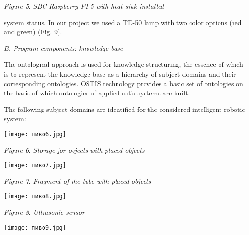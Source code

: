 \documentclass[10pt, letterpaper, twoside]{article}
\begin{document}
\begin{multicols}{2}
\begin{center}
\begin{minipage}{.4\textwidth}
\begin{center}
    \caption{\textsl{Figure 5. SBC Raspberry PI 5 with heat sink installed}}
        \end{center}
    \label{fig:enter-label5}
\end{minipage}
\end{center}
system status. In our project we used a TD-50 lamp with
two color options (red and green) (Fig. 9).
\vspace{3mm}

\textsl{B. Program components: knowledge base}
\vspace{3mm}

The ontological approach is used for knowledge structuring,
the essence of which is to represent the knowledge
base as a hierarchy of subject domains and their
corresponding ontologies. OSTIS technology provides a
basic set of ontologies on the basis of which ontologies
of applied ostis-systems are built.

The following subject domains are identified for the
considered intelligent robotic system:
\begin{center}
\begin{minipage}{.4\textwidth}
    \texttt{[image: пиво6.jpg]}
    \scriptsize
    \begin{center}
        

    \caption{\textsl{Figure 6. Storage for objects with placed objects}}
        \end{center}
    \label{fig:enter-label6}
\end{minipage}
\end{center}
\begin{center}
\begin{minipage}{.4\textwidth}
    \texttt{[image: пиво7.jpg]}
    \scriptsize
    \begin{center}
        

    \caption{\textsl{Figure 7. Fragment of the tube with placed objects}}
        \end{center}
    \label{fig:enter-label7}
\end{minipage}
\end{center}
\begin{center}
\begin{minipage}{.4\textwidth}
    \texttt{[image: пиво8.jpg]}
    \scriptsize
    \begin{center}
        

    \caption{\textsl{Figure 8. Ultrasonic sensor}}
        \end{center}
    \label{fig:enter-label8}
\end{minipage}
\end{center}
\begin{center}
\begin{minipage}{.4\textwidth}
    \texttt{[image: пиво9.jpg]}
    \scriptsize
    \begin{center}
        


\end{center}
\end{minipage}
\end{center}
\end{multicols}
\end{document}
